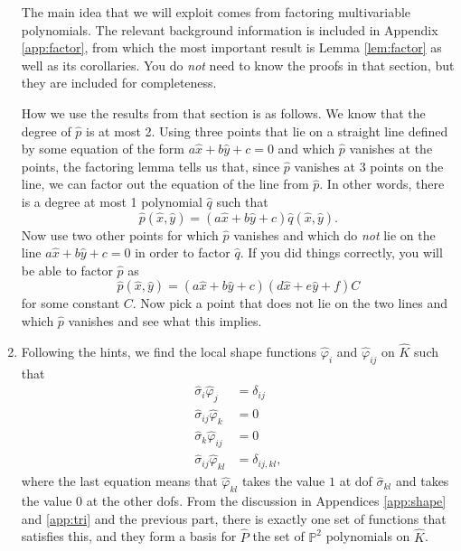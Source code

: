 \documentclass{article}
\theoremstyle{plain}
\theoremstyle{definition}
\theoremstyle{remark}
\begin{document}
\begin{enumerate}
	      The main idea that we will exploit comes from factoring multivariable polynomials.
	      The relevant background information is included in Appendix \ref{app:factor}, from which the most important result is Lemma \ref{lem:factor} as well as its corollaries.
	      You do \emph{not} need to know the proofs in that section, but they are included for completeness.

	      How we use the results from that section is as follows.
	      We know that the degree of $\widehat p$ is at most 2.
	      Using three points that lie on a straight line defined by some equation of the form $a \widehat x + b \widehat y + c = 0$ and which $\widehat p$ vanishes at the points, the factoring lemma tells us that, since $\widehat p$ vanishes at 3 points on the line, we can factor out the equation of the line from $\widehat p$.
	      In other words, there is a degree at most 1 polynomial $\widehat q$ such that \[\widehat p(\widehat x, \widehat y) = (a\widehat x + b\widehat y + c)\widehat q(\widehat x, \widehat y).\]
	      Now use two other points for which $\widehat p$ vanishes and which do \emph{not} lie on the line $a\widehat x + b\widehat y + c = 0$ in order to factor $\widehat q$.
	      If you did things correctly, you will be able to factor $\widehat p$ as \[\widehat p(\widehat x, \widehat y) = (a\widehat x + b\widehat y + c)(d\widehat x + e\widehat y + f)C\] for some constant $C$.
	      Now pick a point that does not lie on the two lines and which $\widehat p$ vanishes and see what this implies.

	\item Following the hints, we find the local shape functions $\widehat \varphi_i$ and $\widehat \varphi_{ij}$ on $\widehat K$ such that
	      \begin{align*}
		      \widehat \sigma_i \widehat \varphi_j       & = \delta_{ij}     \\
		      \widehat \sigma_{ij} \widehat \varphi_k    & = 0               \\
		      \widehat \sigma_k \widehat \varphi_{ij}    & = 0               \\
		      \widehat \sigma_{ij} \widehat \varphi_{kl} & = \delta_{ij,kl},
	      \end{align*}
	      where the last equation means that $\widehat\varphi_{kl}$ takes the value $1$ at dof $\widehat\sigma_{kl}$ and takes the value $0$ at the other dofs.
	      From the discussion in Appendices \ref{app:shape} and \ref{app:tri} and the previous part, there is exactly one set of functions that satisfies this, and they form a basis for $\widehat P$ the set of $\mathbb P^2$ polynomials on $\widehat K$.


\end{enumerate}
\end{document}
